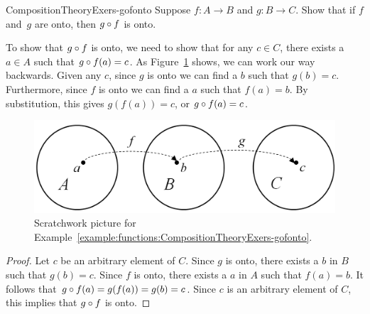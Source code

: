 \begin{example}{CompositionTheoryExers-gofonto} 
 Suppose $f \colon A \to B$ and $g \colon B \to C$. Show that if $f$ and~$g$ are onto, then $g \circ f$ is onto.

\begin{scratchwork}
 To show that $g \circ f$ is onto, we need to show that for any $c \in C$, there exists a $a \in A$ such that $g \circ f(a)=c$.  As Figure~\ref{compose2} shows, we can work our way backwards. Given any $c$, since $g$ is onto we can find a $b$ such that $g(b)=c$.  Furthermore, since $f$ is onto we can find a $a$ such that $f(a)=b$.
By substitution, this gives $g(f(a))=c$, or $g \circ f (a) = c$.
\end{scratchwork}

 \begin{figure}[h]
\includegraphics[width=5in]{images/compose2.png}
\caption{Scratchwork picture for Example~\ref{example:functions:CompositionTheoryExers-gofonto}.}
\label{compose2}
\end{figure}

 \begin{proof}
Let $c$ be an arbitrary  element of $C$. Since $g$ is onto, there exists a $b$ in  $B$ such that $g(b) = c$.  Since $f$ is onto, there exists a $a$ in  $A$ such that $f(a) = b$. It follows that  $g \circ f(a) = g(f(a)) = g(b) = c$. Since $c$ is an arbitrary element of $C$, this implies that $g \circ f$ is onto.
\end{proof}    
 \end{example}


